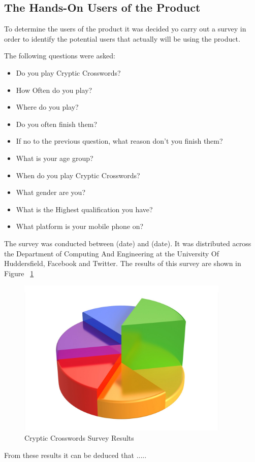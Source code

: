 \subsection{The Hands-On Users of the Product}

To determine the users of the product it was decided yo carry out a survey in
order to identify the potential users that actually will be using the product.

The following questions were asked:

\begin{itemize}
    \item Do you play Cryptic Crosswords?
    \item How Often do you play?
    \item Where do you play?
    \item Do you often finish them?
    \item If no to the previous question, what reason don't you finish them?
    \item What is your age group?
    \item When do you play Cryptic Crosswords?
    \item What gender are you?
    \item What is the Highest qualification you have?
    \item What platform is your mobile phone on?
\end{itemize}

The survey was conducted between (date) and (date). It was distributed across
the Department of Computing And Engineering at the University Of Huddersfield,
Facebook and Twitter. The results of this survey are shown in Figure
~\ref{fig:survey_results}


\begin{figure}[here]
\includegraphics[width=0.9\textwidth]{requirements/project_drivers/survey_results.png}
\caption{Cryptic Crosswords Survey Results}
\label{fig:survey_results}
\end{figure}

From these results it can be deduced that .....